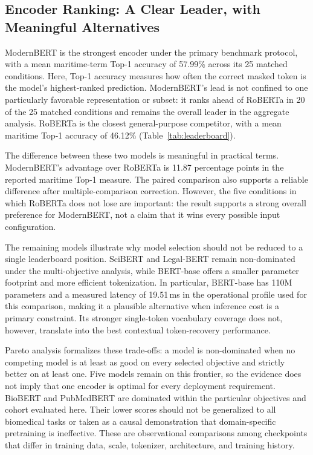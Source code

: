 \subsection{Encoder Ranking: A Clear Leader, with Meaningful Alternatives}
\label{sec:ranking}


ModernBERT is the strongest encoder under the primary benchmark protocol, with a mean maritime-term Top-1 accuracy of 57.99\% across its 25 matched conditions. Here, Top-1 accuracy measures how often the correct masked token is the model's highest-ranked prediction. ModernBERT's lead is not confined to one particularly favorable representation or subset: it ranks ahead of RoBERTa in 20 of the 25 matched conditions and remains the overall leader in the aggregate analysis. RoBERTa is the closest general-purpose competitor, with a mean maritime Top-1 accuracy of 46.12\% (Table~\ref{tab:leaderboard}).

The difference between these two models is meaningful in practical terms. ModernBERT's advantage over RoBERTa is 11.87 percentage points in the reported maritime Top-1 measure. The paired comparison also supports a reliable difference after multiple-comparison correction. However, the five conditions in which RoBERTa does not lose are important: the result supports a strong overall preference for ModernBERT, not a claim that it wins every possible input configuration.

The remaining models illustrate why model selection should not be reduced to a single leaderboard position. SciBERT and Legal-BERT remain non-dominated under the multi-objective analysis, while BERT-base offers a smaller parameter footprint and more efficient tokenization. In particular, BERT-base has 110M parameters and a measured latency of 19.51\,ms in the operational profile used for this comparison, making it a plausible alternative when inference cost is a primary constraint. Its stronger single-token vocabulary coverage does not, however, translate into the best contextual token-recovery performance.

Pareto analysis formalizes these trade-offs: a model is non-dominated when no competing model is at least as good on every selected objective and strictly better on at least one. Five models remain on this frontier, so the evidence does not imply that one encoder is optimal for every deployment requirement. BioBERT and PubMedBERT are dominated within the particular objectives and cohort evaluated here. Their lower scores should not be generalized to all biomedical tasks or taken as a causal demonstration that domain-specific pretraining is ineffective. These are observational comparisons among checkpoints that differ in training data, scale, tokenizer, architecture, and training history.

